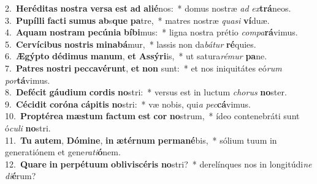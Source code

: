 {2.~}\textbf{He}\textbf{ré}\textbf{di}\textbf{tas} \textbf{no}\textbf{stra} \textbf{ver}\textbf{sa} \textbf{est} \textbf{ad} \textbf{a}\textbf{li}\textbf{é}nos:~* domus nostræ \textit{ad} \textit{ex}\textbf{trá}neos.\\
{3.~}\textbf{Pu}\textbf{píl}\textbf{li} \textbf{fa}\textbf{cti} \textbf{su}\textbf{mus} \textbf{ab}s\textbf{que} \textbf{pa}tre,~* matres nostræ \textit{qua}\textit{si} \textbf{ví}duæ.\\
{4.~}\textbf{A}\textbf{quam} \textbf{no}\textbf{stram} \textbf{pe}\textbf{cú}\textbf{ni}\textbf{a} \textbf{bí}\textbf{bi}mus:~* ligna nostra prétio \textit{com}\textit{pa}\textbf{rá}vimus.\\
{5.~}\textbf{Cer}\textbf{ví}\textbf{ci}\textbf{bus} \textbf{no}\textbf{stris} \textbf{mi}\textbf{na}\textbf{bá}mur,~* lassis non da\textit{bá}\textit{tur} \textbf{ré}quies.\\
{6.~}\textbf{Æ}\textbf{gýp}\textbf{to} \textbf{dé}\textbf{di}\textbf{mus} \textbf{ma}\textbf{num}, \textbf{et} \textbf{As}\textbf{sý}\textbf{ri}is,~* ut satura\textit{ré}\textit{mur} \textbf{pa}ne.\\
{7.~}\textbf{Pa}\textbf{tres} \textbf{no}\textbf{stri} \textbf{pec}\textbf{ca}\textbf{vé}\textbf{runt}, \textbf{et} \textbf{non} sunt:~* et nos iniquitátes eó\textit{rum} \textit{por}\textbf{tá}vimus.\\
{8.~}\textbf{De}\textbf{fé}\textbf{cit} \textbf{gáu}\textbf{di}\textbf{um} \textbf{cor}\textbf{dis} \textbf{no}stri:~* versus est in luctum \textit{cho}\textit{rus} \textbf{no}ster.\\
{9.~}\textbf{Cé}\textbf{ci}\textbf{dit} \textbf{co}\textbf{ró}\textbf{na} \textbf{cá}\textbf{pi}\textbf{tis} \textbf{no}stri:~* væ nobis, qui\textit{a} \textit{pec}\textbf{cá}vimus.\\
{10.~}\textbf{Prop}\textbf{té}\textbf{re}\textbf{a} \textbf{mæ}\textbf{stum} \textbf{fa}\textbf{ctum} \textbf{est} \textbf{cor} \textbf{no}strum,~* ídeo contenebráti sunt ó\textit{cu}\textit{li} \textbf{no}stri.\\
{11.~}\textbf{Tu} \textbf{au}\textbf{tem}, \textbf{Dó}\textbf{mi}\textbf{ne}, \textbf{in} \textbf{æ}\textbf{tér}\textbf{num} \textbf{per}\textbf{ma}\textbf{né}bis,~* sólium tuum in generatiónem et gene\textit{ra}\textit{ti}\textbf{ó}nem.\\
{12.~}\textbf{Qua}\textbf{re} \textbf{in} \textbf{per}\textbf{pé}\textbf{tu}\textbf{um} \textbf{o}\textbf{bli}\textbf{vi}\textbf{scé}\textbf{ris} \textbf{no}stri?~* derelínques nos in longitúdi\textit{ne} \textit{di}\textbf{é}rum?\\
